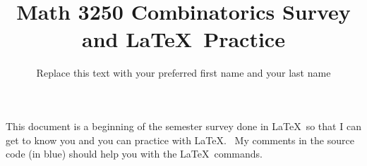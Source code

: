 \documentclass[12pt]{amsart}
\title{Math 3250 Combinatorics Survey and \LaTeX \ Practice}
\author{Replace this text with your preferred first name and your last name}
\begin{document}
\maketitle


This document is a beginning of the semester survey done in \LaTeX \ so that I can get to know you and you can practice with \LaTeX.  \ My comments in the source code (in blue) should help you with the \LaTeX \ commands.

\end{document}
